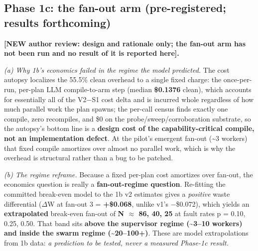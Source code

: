 \documentclass[acmsmall,screen,review,anonymous]{acmart}
\renewenvironment{leftbar}{%
  \def\FrameCommand{\hspace{2pt}{\color{lbcol}\vrule width 1.5pt}\hspace{8pt}}%
  \MakeFramed{\advance\hsize-\width \FrameRestore}\small}%
  {\endMakeFramed}
\begin{document}
\subsection{Phase 1c: the fan-out arm (pre-registered; results forthcoming)}
\begin{leftbar}
\textbf{[NEW \textperiodcentered{} author review: design and rationale only; the fan-out arm has not been run and no result of it is reported here].}

\emph{(a) Why 1b's economics failed in the regime the model predicted.} The cost autopsy localizes the 55.5\% clean overhead to a single fixed charge: the once-per-run, per-plan LLM compile-to-arm step (median \textbf{\$0.1376} clean), which accounts for essentially all of the V2$-$S1 cost delta and is incurred whole regardless of how much parallel work the plan spawns; the per-call census finds exactly one compile, zero recompiles, and \$0 on the probe/sweep/corroboration substrate, so the autopsy's bottom line is a \textbf{design cost of the capability-critical compile, not an implementation defect}. At the pilot's emergent fan-out (\textasciitilde{}3 workers) that fixed compile amortizes over almost no parallel work, which is why the overhead is structural rather than a bug to be patched.

\emph{(b) The regime reframe.} Because a fixed per-plan cost amortizes over fan-out, the economics question is really a \textbf{fan-out-regime question}. Re-fitting the committed break-even model to the 1b v2 estimates gives a \emph{positive} waste differential ($\Delta$W at fan-out 3 = \textbf{+\$0.068}, unlike v1's $-$\$0.072), which yields an \textbf{extrapolated} break-even fan-out of \textbf{N $\approx$ 86, 40, 25} at fault rates p = 0.10, 0.25, 0.50. That band sits \textbf{above the supervisor regime (\textasciitilde{}3--10 workers) and inside the swarm regime (\textasciitilde{}20--100+)}. These are model extrapolations from 1b data: \emph{a prediction to be tested, never a measured Phase-1c result.}


\end{leftbar}
\end{document}
